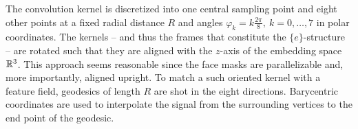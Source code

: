 The convolution kernel is discretized into one central sampling point and eight other points at a fixed radial distance $R$ and angles $\varphi_k = k\frac{2\pi}{8},\ k=0,\dots,7$ in polar coordinates.
The kernels -- and thus the frames that constitute the $\{e\}$-structure -- are rotated such that they are aligned with the $z$-axis of the embedding space~$\mathbb{R}^3$.
This approach seems reasonable since the face masks are parallelizable and, more importantly, aligned upright.
To match a such oriented kernel with a feature field, geodesics of length $R$ are shot in the eight directions.
Barycentric coordinates are used to interpolate the signal from the surrounding vertices to the end point of the geodesic.








